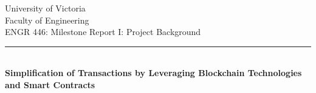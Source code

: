 \documentclass[12pt]{scrartcl}
\begin{document}
\begin{titlepage}
	\begin{center}
		{\vspace*{3pt} }
		{\Large University of Victoria \\ \vspace{4pt}}
		{\Large Faculty of Engineering \\ \vspace{4pt}}
		{\Large ENGR 446: Milestone Report I: Project Background \\ \vspace{4pt}}  
		\rule[13pt]{1\textwidth}{1pt} \\ \vspace{1pt}
		{\LARGE \textbf{{Simplification of Transactions by Leveraging Blockchain Technologies and Smart Contracts}} \\ \vspace{15 pt}}
		

\end{center}
\end{titlepage}
\end{document}
